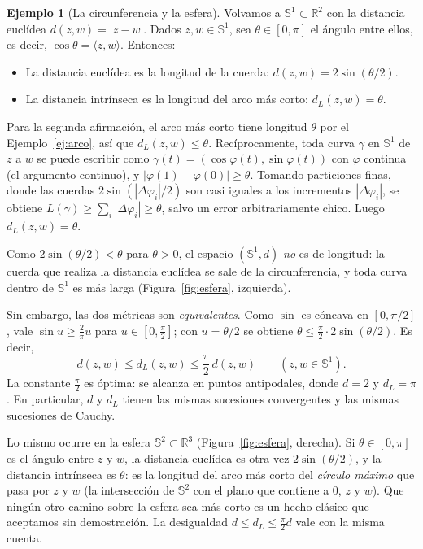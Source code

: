 \documentclass[12pt, a4paper]{amsart}
\theoremstyle{definition}
\newtheorem{ejemplo}[teorema]{Ejemplo}
\theoremstyle{remark}
\begin{document}
\begin{ejemplo}[La circunferencia y la esfera]\label{ej:esfera}
Volvamos a $\mathbb S^1\subset\mathbb R^2$ con la distancia euclídea $d(z,w)=|z-w|$. Dados $z,w\in \mathbb S^1$, sea $\theta\in[0,\pi]$ el ángulo entre ellos, es decir, $\cos\theta=\langle z,w\rangle$. Entonces:

\begin{itemize}
\item La distancia euclídea es la longitud de la cuerda: $d(z,w)=2\sin(\theta/2)$.
\item La distancia intrínseca es la longitud del arco más corto: $d_L(z,w)=\theta$.
\end{itemize}

Para la segunda afirmación, el arco más corto tiene longitud $\theta$ por el Ejemplo~\ref{ej:arco}, así que $d_L(z,w)\le\theta$. Recíprocamente, toda curva $\gamma$ en $\mathbb S^1$ de $z$ a $w$ se puede escribir como $\gamma(t)=(\cos\varphi(t),\sin\varphi(t))$ con $\varphi$ continua (el argumento continuo), y $|\varphi(1)-\varphi(0)|\ge\theta$. Tomando particiones finas, donde las cuerdas $2\sin(|\Delta\varphi_i|/2)$ son casi iguales a los incrementos $|\Delta\varphi_i|$, se obtiene $L(\gamma)\ge\sum_i|\Delta\varphi_i|\ge\theta$, salvo un error arbitrariamente chico. Luego $d_L(z,w)=\theta$.

Como $2\sin(\theta/2)<\theta$ para $\theta>0$, el espacio $(\mathbb S^1,d)$ \emph{no} es de longitud: la cuerda que realiza la distancia euclídea se sale de la circunferencia, y toda curva dentro de $\mathbb S^1$ es más larga (Figura~\ref{fig:esfera}, izquierda).

Sin embargo, las dos métricas son \emph{equivalentes}. Como $\sin$ es cóncava en $[0,\pi/2]$, vale $\sin u\ge\frac{2}{\pi}u$ para $u\in[0,\frac\pi2]$; con $u=\theta/2$ se obtiene $\theta\le\frac\pi2\cdot2\sin(\theta/2)$. Es decir,
\[
d(z,w)\le d_L(z,w)\le\frac{\pi}{2}\,d(z,w)\qquad(z,w\in \mathbb S^1).
\]
La constante $\frac\pi2$ es óptima: se alcanza en puntos antipodales, donde $d=2$ y $d_L=\pi$. En particular, $d$ y $d_L$ tienen las mismas sucesiones convergentes y las mismas sucesiones de Cauchy.

Lo mismo ocurre en la esfera $\mathbb S^2\subset\mathbb R^3$ (Figura~\ref{fig:esfera}, derecha). Si $\theta\in[0,\pi]$ es el ángulo entre $z$ y $w$, la distancia euclídea es otra vez $2\sin(\theta/2)$, y la distancia intrínseca es $\theta$: es la longitud del arco más corto del \emph{círculo máximo} que pasa por $z$ y $w$ (la intersección de $\mathbb S^2$ con el plano que contiene a $0$, $z$ y $w$). Que ningún otro camino sobre la esfera sea más corto es un hecho clásico que aceptamos sin demostración. La desigualdad $d\le d_L\le\frac\pi2 d$ vale con la misma cuenta.
\end{ejemplo}
\end{document}

